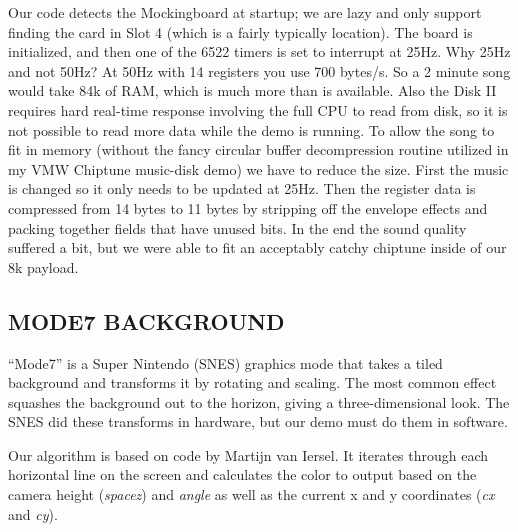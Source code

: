 \documentclass[twocolumn]{article}
\begin{document}
Our code detects the Mockingboard at startup; we are lazy and only support
finding the card in Slot 4 (which is a fairly typically location).
The board is initialized, and then one of the 6522 timers is set to
interrupt at 25Hz.
Why 25Hz and not 50Hz?  At 50Hz with 14 registers you use 700 bytes/s.
So a 2 minute song would take 84k of RAM, which is much more than is available.
Also the Disk II requires hard real-time response involving the full 
CPU to read from disk, so it is not possible to read more data while
the demo is running.
To allow the song to fit in memory (without the fancy circular buffer
decompression routine utilized in my VMW Chiptune music-disk demo) we have
to reduce the size.
First the music is changed so it only needs to be updated at 25Hz.
Then the register data is compressed from 14 bytes to 11 bytes by stripping off
the envelope effects and packing together fields that have unused bits.
In the end the sound quality suffered a bit, but we were able to fit an
acceptably catchy chiptune inside of our 8k payload.

\subsection{MODE7 BACKGROUND}

``Mode7'' is a Super Nintendo (SNES) graphics mode that takes a tiled
background and transforms it by rotating and scaling.
The most common effect squashes the background out to the horizon, giving
a three-dimensional look.
The SNES did these transforms in hardware, but our demo must do
them in software.

%


Our algorithm is based on code by Martijn van Iersel.
It iterates through each horizontal line on the screen and calculates the color
to output based on the camera height ({\em spacez}) and {\em angle} as well
as the current x and y coordinates ({\em cx} and {\em cy}).
\end{document}
